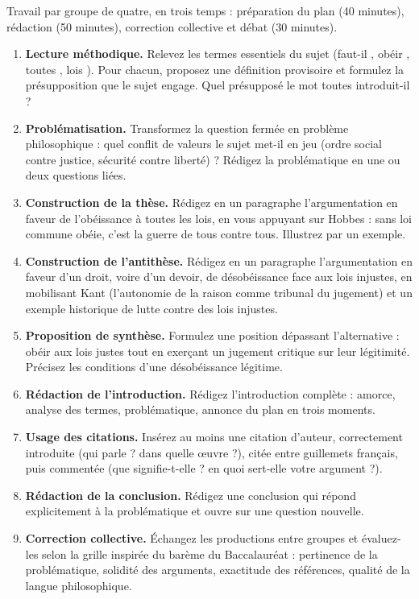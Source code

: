 \documentclass[11pt]{article}
\newcounter{popsec}
\newcounter{popsub}
\newcommand{\courssub}[1]{%
  \stepcounter{popsub}%
  \par\vspace{9pt}\noindent{\popxbold\fontsize{11.5}{13}\selectfont\color{popink}{\color{poporange}\thepopsec.\thepopsub}\hspace{6pt}#1}\par\nopagebreak\vspace{4pt}
}
\begin{document}
\courssub{Consignes}

Travail par groupe de quatre, en trois temps : préparation du plan (40 minutes), rédaction (50 minutes), correction collective et débat (30 minutes).

\begin{enumerate}
\item \textbf{Lecture méthodique.} Relevez les termes essentiels du sujet (\guillemotleft faut-il \guillemotright, \guillemotleft obéir \guillemotright, \guillemotleft toutes \guillemotright, \guillemotleft lois \guillemotright). Pour chacun, proposez une définition provisoire et formulez la présupposition que le sujet engage. Quel présupposé le mot \guillemotleft toutes \guillemotright introduit-il ?
\item \textbf{Problématisation.} Transformez la question fermée en problème philosophique : quel conflit de valeurs le sujet met-il en jeu (ordre social contre justice, sécurité contre liberté) ? Rédigez la problématique en une ou deux questions liées.
\item \textbf{Construction de la thèse.} Rédigez en un paragraphe l'argumentation en faveur de l'obéissance à toutes les lois, en vous appuyant sur Hobbes : sans loi commune obéie, c'est la guerre de tous contre tous. Illustrez par un exemple.
\item \textbf{Construction de l'antithèse.} Rédigez en un paragraphe l'argumentation en faveur d'un droit, voire d'un devoir, de désobéissance face aux lois injustes, en mobilisant Kant (l'autonomie de la raison comme tribunal du jugement) et un exemple historique de lutte contre des lois injustes.
\item \textbf{Proposition de synthèse.} Formulez une position dépassant l'alternative : obéir aux lois justes tout en exerçant un jugement critique sur leur légitimité. Précisez les conditions d'une désobéissance légitime.
\item \textbf{Rédaction de l'introduction.} Rédigez l'introduction complète : amorce, analyse des termes, problématique, annonce du plan en trois moments.
\item \textbf{Usage des citations.} Insérez au moins une citation d'auteur, correctement introduite (qui parle ? dans quelle œuvre ?), citée entre guillemets français, puis commentée (que signifie-t-elle ? en quoi sert-elle votre argument ?).
\item \textbf{Rédaction de la conclusion.} Rédigez une conclusion qui répond explicitement à la problématique et ouvre sur une question nouvelle.
\item \textbf{Correction collective.} Échangez les productions entre groupes et évaluez-les selon la grille inspirée du barème du Baccalauréat : pertinence de la problématique, solidité des arguments, exactitude des références, qualité de la langue philosophique.
\end{enumerate}
\end{document}
